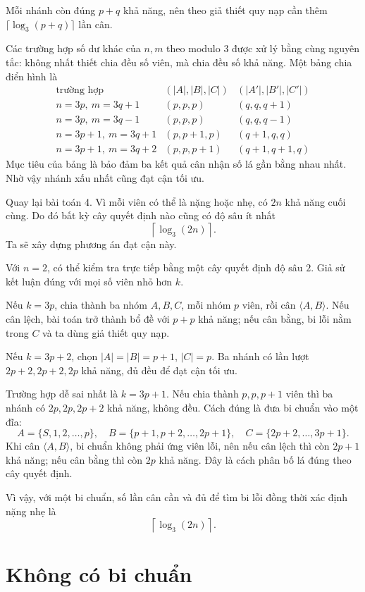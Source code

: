 \documentclass[11pt]{article}
\begin{document}
Mỗi nhánh còn đúng \(p+q\) khả năng, nên theo giả thiết quy nạp cần thêm
\(\lceil\log_3(p+q)\rceil\) lần cân.

Các trường hợp số dư khác của \(n,m\) theo modulo \(3\) được xử lý bằng cùng
nguyên tắc: không nhất thiết chia đều số viên, mà chia đều số khả năng. Một
bảng chia điển hình là
\[
\begin{array}{c|c|c}
\text{trường hợp} & (|A|,|B|,|C|) & (|A'|,|B'|,|C'|)\\ \hline
n=3p,\ m=3q+1 & (p,p,p) & (q,q,q+1)\\
n=3p,\ m=3q-1 & (p,p,p) & (q,q,q-1)\\
n=3p+1,\ m=3q+1 & (p,p+1,p) & (q+1,q,q)\\
n=3p+1,\ m=3q+2 & (p,p,p+1) & (q+1,q+1,q)
\end{array}
\]
Mục tiêu của bảng là bảo đảm ba kết quả cân nhận số lá gần bằng nhau nhất.
Nhờ vậy nhánh xấu nhất cũng đạt cận tối ưu.

Quay lại bài toán 4. Vì mỗi viên có thể là nặng hoặc nhẹ, có \(2n\) khả năng
cuối cùng. Do đó bất kỳ cây quyết định nào cũng có độ sâu ít nhất
\[
  \left\lceil \log_3(2n) \right\rceil .
\]
Ta sẽ xây dựng phương án đạt cận này.

Với \(n=2\), có thể kiểm tra trực tiếp bằng một cây quyết định độ sâu \(2\).
Giả sử kết luận đúng với mọi số viên nhỏ hơn \(k\).

Nếu \(k=3p\), chia thành ba nhóm \(A,B,C\), mỗi nhóm \(p\) viên, rồi cân
\(\langle A,B\rangle\). Nếu cân lệch, bài toán trở thành bổ đề với \(p+p\)
khả năng; nếu cân bằng, bi lỗi nằm trong \(C\) và ta dùng giả thiết quy nạp.

Nếu \(k=3p+2\), chọn \(|A|=|B|=p+1\), \(|C|=p\). Ba nhánh có lần lượt
\(2p+2,2p+2,2p\) khả năng, đủ đều để đạt cận tối ưu.

Trường hợp dễ sai nhất là \(k=3p+1\). Nếu chia thành \(p,p,p+1\) viên thì ba
nhánh có \(2p,2p,2p+2\) khả năng, không đều. Cách đúng là đưa bi chuẩn vào
một đĩa:
\[
  A=\{S,1,2,\ldots,p\},\quad
  B=\{p+1,p+2,\ldots,2p+1\},\quad
  C=\{2p+2,\ldots,3p+1\}.
\]
Khi cân \(\langle A,B\rangle\), bi chuẩn không phải ứng viên lỗi, nên nếu cân
lệch thì còn \(2p+1\) khả năng; nếu cân bằng thì còn \(2p\) khả năng. Đây là
cách phân bố lá đúng theo cây quyết định.

Vì vậy, với một bi chuẩn, số lần cân cần và đủ để tìm bi lỗi đồng thời xác
định nặng nhẹ là
\[
  \left\lceil \log_3(2n) \right\rceil .
\]

\section{Không có bi chuẩn}
\end{document}

